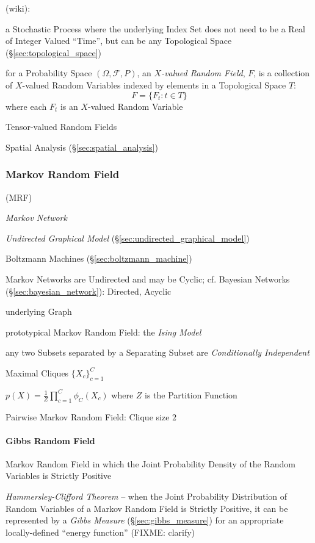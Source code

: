 (wiki):

a Stochastic Process where the underlying Index Set does not need to be a Real
of Integer Valued ``Time'', but can be any Topological Space
(\S\ref{sec:topological_space})

for a Probability Space $(\Omega, \mathcal{F}, P)$, an \emph{$X$-valued
  Random Field}, $F$, is a collection of $X$-valued Random Variables indexed by
elements in a Topological Space $T$:
\[
  F = \{ F_t : t \in T \}
\]
where each $F_t$ is an $X$-valued Random Variable

Tensor-valued Random Fields

\fist Spatial Analysis (\S\ref{sec:spatial_analysis})



\subsubsection{Markov Random Field}\label{sec:markov_random_field}

(MRF)

\emph{Markov Network}

\emph{Undirected Graphical Model} (\S\ref{sec:undirected_graphical_model})

Boltzmann Machines (\S\ref{sec:boltzmann_machine})

Markov Networks are Undirected and may be Cyclic;
cf. Bayesian Networks (\S\ref{sec:bayesian_network}): Directed, Acyclic

underlying Graph

prototypical Markov Random Field: the \emph{Ising Model}

any two Subsets separated by a Separating Subset are \emph{Conditionally
Independent}

Maximal Cliques $\{X_c\}_{c=1}^C$

$p(X) = \frac{1}{Z}\prod_{c=1}^C \phi_C(X_c)$ where $Z$ is the Partition
Function

Pairwise Markov Random Field: Clique size $2$



\paragraph{Gibbs Random Field}\label{sec:gibbs_random_field}\hfill

Markov Random Field in which the Joint Probability Density of the Random
Variables is Strictly Positive

\emph{Hammersley-Clifford Theorem} -- when the Joint Probability Distribution of
Random Variables of a Markov Random Field is Strictly Positive, it can be
represented by a \emph{Gibbs Measure} (\S\ref{sec:gibbs_measure}) for an
appropriate locally-defined ``energy function'' (FIXME: clarify)



